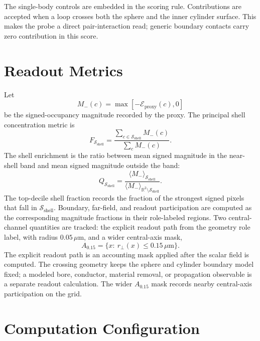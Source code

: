 \documentclass[11pt]{article}
\newcommand{\um}{\,\mu\mathrm{m}}
\newcommand{\R}{\mathbb{R}}
\newcommand{\shell}{\mathcal{S}_{\mathrm{shell}}}
\newcommand{\Eproxy}{\mathcal{E}_{\mathrm{proxy}}}
\newcommand{\Nneg}{M_{-}}
\begin{document}
The single-body controls are embedded in the scoring rule. Contributions are
accepted when a loop crosses both the sphere and the inner cylinder surface.
This makes the probe a direct pair-interaction read; generic
boundary contacts carry zero contribution in this score.

\section{Readout Metrics}

Let
\begin{equation}
  \Nneg(c)=\max[-\Eproxy(c),0]
\end{equation}
be the signed-occupancy magnitude recorded by the proxy. The principal shell
concentration metric is
\begin{equation}
  F_{\shell} =
  \frac{\sum_{c\in\shell}\Nneg(c)}
       {\sum_{c}\Nneg(c)}.
\end{equation}
The shell enrichment is the ratio between mean signed magnitude in the
near-shell band and mean signed magnitude outside the band:
\begin{equation}
  Q_{\shell} =
  \frac{\langle \Nneg\rangle_{\shell}}
       {\langle \Nneg\rangle_{\R^2\setminus\shell}}.
\end{equation}
The top-decile shell fraction records the fraction of the strongest signed
pixels that fall in $\shell$. Boundary, far-field, and readout participation
are computed as the corresponding magnitude fractions in their role-labeled
regions. Two central-channel quantities are tracked: the explicit readout path
from the geometry role label, with radius $0.05\um$, and a wider central-axis
mask,
\begin{equation}
  A_{0.15}=\{x:\ r_\perp(x)\leq 0.15\um\}.
\end{equation}
The explicit readout path is an accounting mask applied after the scalar field
is computed. The crossing geometry keeps the sphere and cylinder boundary model
fixed; a modeled bore, conductor, material removal, or propagation observable is
a separate readout calculation. The wider $A_{0.15}$ mask records nearby
central-axis participation on the grid.

\section{Computation Configuration}
\end{document}
